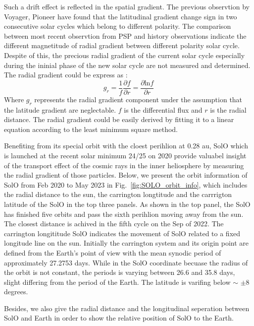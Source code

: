 Such a drift effect is reflected in the spatial gradient. The previous observtion by Voyager, Pioneer have found that the latitudinal gradient change sign in two consecutive solar cycles which belong to different polarity.
The comparison between most recent observtion from \ac{PSP} and history observations indicate the different magnetitude of radial gradient between different polarity solar cycle. Despite of this, the precious radial gradient of the current solar cycle especially during the ininial phase of the new solar cycle are not measured and determined.
The radial gradient could be express as \cite{Rankin2021ApJ} :
\begin{equation}
    g_r = \frac{1}{f}\frac{\partial{f}}{\partial{r}} = \frac{\partial{\mathrm{ln} f}}{\partial{r}}
    \label{eq:radial_gradient}
\end{equation}
Where $g_r$ represents the radial gradient component under the assumption that the latitude gradient are neglectable. $f$ is the differential flux and $r$ is the radial distance. The radial gradient could be easily derived by fitting it to a linear equation according to the least minimum square method.


Benefiting from its special orbit with the cloest perihlion at 0.28 au, \ac{SolO} which is launched at the recent solar minimum 24/25 on 2020 provide valuabel insight of the transport effect of the cosmic rays in the inner heliosphere by measuring the radial gradient of those particles.
Below, we present the orbit information of \ac{SolO} from Feb 2020 to May 2023 in Fig.~\ref{fig:SOLO_orbit_info}, which includes the radial distance to the sun, the carrington longtitude and the carrrigton latitude of the \ac{SolO} in the top three panels. As shown in the top panel, the \ac{SolO} has finished five orbits and pass the sixth perihlion moving away from the sun. The closest distance is achived in the fifth cycle on the Sep of 2022. 
The carrington longititude \ac{SolO} indicates the movement of \ac{SolO} related to a fixed longitude line on the sun. Initially the carrington system and its origin point are defined from the Earth's point of view with the mean synodic period of approximately 27.2753 days. While in the \ac{SolO} coordinate becuase the radius of the orbit is not constant, the periods is varying between 26.6 and 35.8 days, slight differing from the period of the Earth.
The latitude is varifing below $\sim$ $\pm$8 degrees.

Besides, we also give the radial distance and the longitudinal seperation between \ac{SolO} and Earth in order to show the relative position of \ac{SolO} to the Earth.

